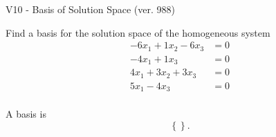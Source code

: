 \begin{exercise}
  \begin{exerciseTitle}V10 - Basis of Solution Space (ver. 988)\end{exerciseTitle}
  \begin{exerciseStatement}
    Find a basis for the solution space of the homogeneous system 
\begin{align*}
 -6 x_ 1 + 1 x_ 2 -6 x_ 3 &= 0  \\ 
  -4 x_ 1 + 1 x_ 3 &= 0  \\ 
  4 x_ 1 + 3 x_ 2 + 3 x_ 3 &= 0  \\ 
  5 x_ 1 -4 x_ 3 &= 0  \\ 
 \end{align*}


 
  \end{exerciseStatement}

  \begin{exerciseAnswer}
   A basis is   
\[\left\{\right\}.\]

  


  \end{exerciseAnswer}
\end{exercise}